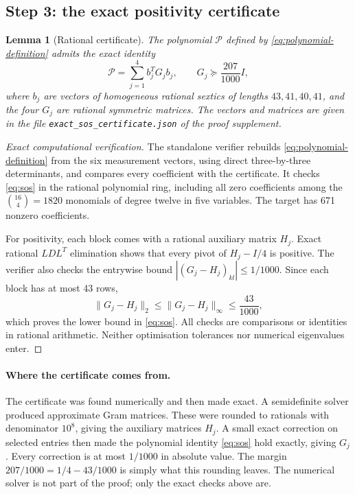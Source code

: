 \documentclass[11pt,a4paper]{article}
\numberwithin{equation}{section}
\newtheorem{lemma}[theorem]{Lemma}
\theoremstyle{remark}\newtheorem{remark}[theorem]{Remark}
\begin{document}
\subsection{Step 3: the exact positivity certificate}
\begin{lemma}[Rational certificate]\label{lem:sos}
The polynomial $\mathcal P$ defined by \eqref{eq:polynomial-definition} admits the exact identity
\begin{equation}
\mathcal P=\sum_{j=1}^{4} b_j^T G_j b_j,
\qquad G_j\succeq\frac{207}{1000}I,
\label{eq:sos}
\end{equation}
where $b_j$ are vectors of homogeneous rational sextics of lengths $43,41,40,41$, and the four $G_j$ are rational symmetric matrices. The vectors and matrices are given in the file \texttt{exact\_sos\_certificate.json} of the proof supplement.
\end{lemma}
\begin{proof}[Exact computational verification]
The standalone verifier rebuilds \eqref{eq:polynomial-definition} from the six measurement vectors, using direct three-by-three determinants, and compares every coefficient with the certificate. It checks \eqref{eq:sos} in the rational polynomial ring, including all zero coefficients among the $\binom{16}{4}=1820$ monomials of degree twelve in five variables. The target has 671 nonzero coefficients.

For positivity, each block comes with a rational auxiliary matrix $H_j$. Exact rational $LDL^T$ elimination shows that every pivot of $H_j-I/4$ is positive. The verifier also checks the entrywise bound $|(G_j-H_j)_{kl}|\le1/1000$. Since each block has at most 43 rows,
\[
\|G_j-H_j\|_2\le\|G_j-H_j\|_\infty\le\frac{43}{1000},
\]
which proves the lower bound in \eqref{eq:sos}. All checks are comparisons or identities in rational arithmetic. Neither optimisation tolerances nor numerical eigenvalues enter.
\end{proof}

\paragraph{Where the certificate comes from.}
The certificate was found numerically and then made exact. A semidefinite solver produced approximate Gram matrices. These were rounded to rationals with denominator $10^8$, giving the auxiliary matrices $H_j$. A small exact correction on selected entries then made the polynomial identity \eqref{eq:sos} hold exactly, giving $G_j$. Every correction is at most $1/1000$ in absolute value. The margin $207/1000=1/4-43/1000$ is simply what this rounding leaves. The numerical solver is not part of the proof; only the exact checks above are.
\end{document}
